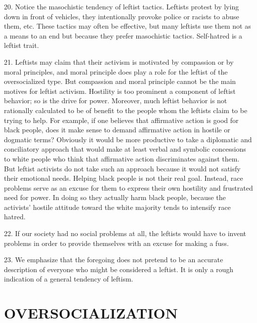 \documentclass{article}
\begin{document}
20. Notice the masochistic tendency of leftist tactics. Leftists protest by lying down in front of 
vehicles, they intentionally provoke police or racists to abuse them, etc. These tactics may often 
be effective, but many leftists use them not as a means to an end but because they prefer 
masochistic tactics. Self-hatred is a leftist trait. \vspace{\baselineskip}

21. Leftists may claim that their activism is motivated by compassion or by moral principles, and 
moral principle does play a role for the leftist of the oversocialized type. But compassion and 
moral principle cannot be the main motives for leftist activism. Hostility is too prominent a 
component of leftist behavior; so is the drive for power. Moreover, much leftist behavior is not 
rationally calculated to be of benefit to the people whom the leftists claim to be trying to help. For 
example, if one believes that affirmative action is good for black people, does it make sense to 
demand affirmative action in hostile or dogmatic terms? Obviously it would be more productive 
to take a diplomatic and conciliatory approach that would make at least verbal and symbolic 
concessions to white people who think that affirmative action discriminates against them. But 
leftist activists do not take such an approach because it would not satisfy their emotional 
needs. Helping black people is not their real goal. Instead, race problems serve as an excuse for 
them to express their own hostility and frustrated need for power. In doing so they actually harm 
black people, because the activists’ hostile attitude toward the white majority tends to intensify 
race hatred. \vspace{\baselineskip}

22. If our society had no social problems at all, the leftists would have to invent problems in order 
to provide themselves with an excuse for making a fuss. \vspace{\baselineskip} \newpage

23. We emphasize that the foregoing does not pretend to be an accurate description of everyone 
who might be considered a leftist. It is only a rough indication of a general tendency of leftism. \vspace{\baselineskip}


\section{OVERSOCIALIZATION}
\end{document}

